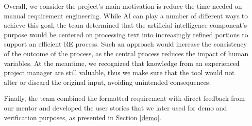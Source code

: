 Overall, we consider the project's main motivation is reduce the time needed on manual requirement engineering. While AI can play a number of different ways to achieve this goal, the team determined that the artificial intelligence component’s purpose would be centered on processing text into increasingly refined portions to support an efficient RE process. Such an approach would increase the consistency of the outcome of the process, as the central process reduces the impact of human variables. At the meantime, we recognized that knowledge from an experienced project manager are still valuable, thus we make sure that the tool would not alter or discard the original input, avoiding unintended consequences. 

Finally, the team combined the formatted requirement with direct feedback from our mentor and developed the user stories that we later used for demo and verification purposes, as presented in Section \ref{demo}.